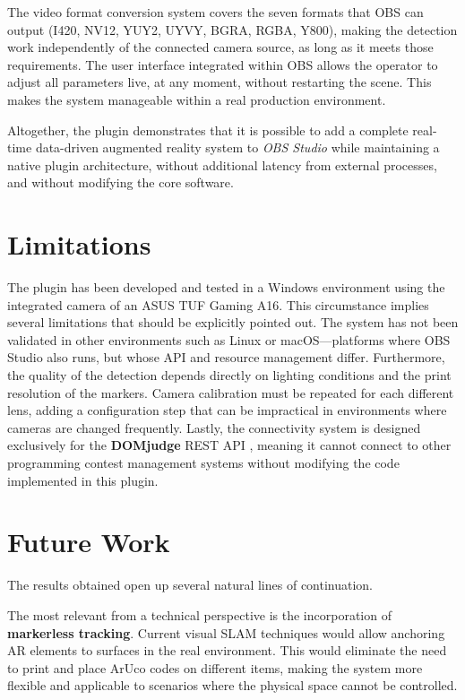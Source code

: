 The video format conversion system covers the seven formats that OBS can output (I420, NV12, YUY2, UYVY, BGRA, RGBA, Y800), making the detection work independently of the connected camera source, as long as it meets those requirements. The user interface integrated within OBS allows the operator to adjust all parameters live, at any moment, without restarting the scene. This makes the system manageable within a real production environment.

Altogether, the plugin demonstrates that it is possible to add a complete real-time data-driven augmented reality system to \textit{OBS Studio} while maintaining a native plugin architecture, without additional latency from external processes, and without modifying the core software.

\section{Limitations}

The plugin has been developed and tested in a Windows environment using the integrated camera of an ASUS TUF Gaming A16. This circumstance implies several limitations that should be explicitly pointed out. The system has not been validated in other environments such as Linux or macOS—platforms where OBS Studio also runs, but whose API and resource management differ. Furthermore, the quality of the detection depends directly on lighting conditions and the print resolution of the markers. Camera calibration must be repeated for each different lens, adding a configuration step that can be impractical in environments where cameras are changed frequently. Lastly, the connectivity system is designed exclusively for the \textbf{DOMjudge} REST API \citep{DOMjudge}, meaning it cannot connect to other programming contest management systems without modifying the code implemented in this plugin.

\section{Future Work}

The results obtained open up several natural lines of continuation.

The most relevant from a technical perspective is the incorporation of \textbf{markerless tracking}. Current visual SLAM techniques \citep{MurArtal2015} would allow anchoring AR elements to surfaces in the real environment. This would eliminate the need to print and place ArUco codes on different items, making the system more flexible and applicable to scenarios where the physical space cannot be controlled.

